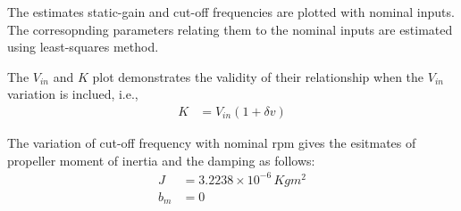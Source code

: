 The estimates static-gain and cut-off frequencies are plotted with nominal inputs. The corresopnding parameters relating them to the nominal inputs are estimated using least-squares method.

The $V_{in}$ and $K$ plot demonstrates the validity of their relationship when the $V_{in}$ variation is inclued, i.e.,
\begin{align*}
    K &= V_{in} (1 + \delta v)
\end{align*}

The variation of cut-off frequency with nominal rpm gives the esitmates of propeller moment of inertia and the damping as follows:
\begin{align*}
    J &= 3.2238 \times 10^{-6} \, Kg m^2\\
    b_m &= 0
\end{align*}

